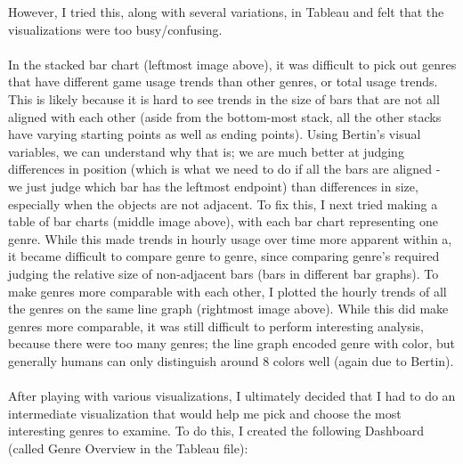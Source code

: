 \documentclass[pdftex,12pt,a4paper]{article}
\begin{document}
However, I tried this, along with several variations, in Tableau and felt that the visualizations were too busy/confusing. \\ \\
In the stacked bar chart (leftmost image above), it was difficult to pick out genres that have different game usage trends than other genres, or total usage trends. This is likely because it is hard to see trends in the size of bars that are not all aligned with each other (aside from the bottom-most stack, all the other stacks have varying starting points as well as ending points). Using Bertin's visual variables, we can understand why that is; we are much better at judging differences in position (which is what we need to do if all the bars are aligned - we just judge which bar has the leftmost endpoint) than differences in size, especially when the objects are not adjacent. To fix this, I next tried making a table of bar charts (middle image above), with each bar chart representing one genre. While this made trends in hourly usage over time more apparent within a, it became difficult to compare genre to genre, since comparing genre's required judging the relative size of non-adjacent bars (bars in different bar graphs). To make genres more comparable with each other, I plotted the hourly trends of all the genres on the same line graph (rightmost image above). While this did make genres more comparable, it was still difficult to perform interesting analysis, because there were too many genres; the line graph encoded genre with color, but generally humans can only distinguish around 8 colors well (again due to Bertin).  \\ \\
After playing with various visualizations, I ultimately decided that I had to do an intermediate visualization that would help me pick and choose the most interesting genres to examine. To do this, I created the following Dashboard (called Genre Overview in the Tableau file): \\ \\
\end{document}

